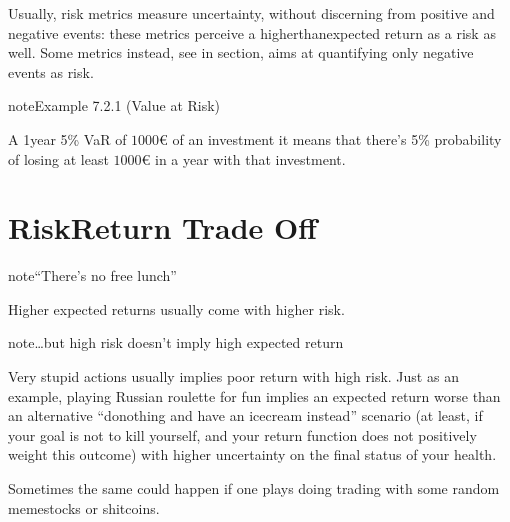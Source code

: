\documentclass[letterpaper,10pt,english]{jupyterBook}
\begin{document}
\sphinxAtStartPar
Usually, risk metrics measure uncertainty, without discerning from positive and negative events: these metrics perceive a higher\sphinxhyphen{}than\sphinxhyphen{}expected return as a risk as well. Some metrics instead, see  in {\hyperref[\detokenize{ch/principles/intro_nb:fin-edu-principles-rr}]{}} section, aims at quantifying only negative events as risk.
\label{ch/principles/intro_nb:example-2}
\begin{sphinxadmonition}{note}{Example 7.2.1 (Value at Risk)}



\sphinxAtStartPar
A 1\sphinxhyphen{}year 5\% VaR of \(1000\text{€}\) of an investment it means that there’s 5\% probability of losing at least \(1000\text{€}\) in a year with that investment.
\end{sphinxadmonition}


\section{Risk\sphinxhyphen{}Return Trade Off}
\label{\detokenize{ch/principles/intro_nb:risk-return-trade-off}}\label{\detokenize{ch/principles/intro_nb:fin-edu-principles-rr}}
\begin{sphinxadmonition}{note}{“There’s no free lunch”}

\sphinxAtStartPar
Higher expected returns usually come with higher risk.
\end{sphinxadmonition}

\begin{sphinxadmonition}{note}{…but high risk doesn’t imply high expected return}

\sphinxAtStartPar
Very stupid actions usually implies poor return with high risk. Just as an example, playing Russian roulette for fun implies an expected return worse than an alternative “do\sphinxhyphen{}nothing and have an ice\sphinxhyphen{}cream instead” scenario (at least, if your goal is not to kill yourself, and your return function does not positively weight this outcome) with higher uncertainty on the final status of your health.

\sphinxAtStartPar
Sometimes the same could happen if one plays doing trading with some random meme\sphinxhyphen{}stocks or shit\sphinxhyphen{}coins.
\end{sphinxadmonition}
\end{document}
